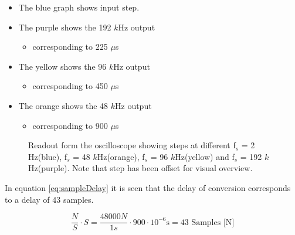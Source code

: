 \begin{itemize}
	\item The \textcolor{MATLABblue}{blue} graph shows input step.
	\item The \textcolor{MATLABpurple}{purple} shows the 192 $k$Hz output
	\begin{itemize}
		\item corresponding to 225 $\mu$s
	\end{itemize}
	\item The \textcolor{MATLAByellow}{yellow} shows the 96 $k$Hz output
	\begin{itemize}
		\item corresponding to 450 $\mu$s
	\end{itemize}
	\item The \textcolor{MATLABorange}{orange} shows the 48 $k$Hz output
	\begin{itemize}
		\item corresponding to 900 $\mu$s
	\end{itemize}
\end{itemize}
 

\begin{figure}[H]
	\centering
	
	\caption{Readout form the oscilloscope showing steps at different f$_s$ = 2 Hz(blue), f$_s$ = 48 $k$Hz(orange), f$_s$ = 96 $k$Hz(yellow) and f$_s$ = 192 $k$Hz(purple). Note that step has been offset for visual overview.}
	\label{fig:ScopeDelayExperiment}
\end{figure}

In equation \ref{eq:sampleDelay} it is seen that the delay of conversion corresponds to a delay of 43 samples.

\begin{equation}\label{eq:sampleDelay}
	\frac{N}{S} \cdot S = \frac{48000N}{1s} \cdot 900\cdot 10^{-6}\text{s} = 43 \text{ Samples [N]} 
\end{equation}





